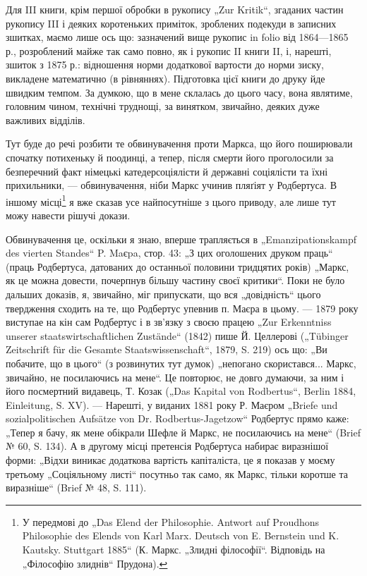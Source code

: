 Для III книги, крім першої обробки в рукопису „Zur Kritik“, згаданих
частин рукопису III і деяких коротеньких приміток, зроблених подекуди
в записних зшитках, маємо лише ось що: зазначений вище рукопис
in folio від 1864—1865 р., розроблений майже так само повно, як
і рукопис II книги II, і, нарешті, зшиток з 1875 р.: відношення норми
додаткової вартости до норми зиску, викладене математично (в рівняннях).
Підготовка цієї книги до друку йде швидким темпом. За думкою,
що в мене склалась до цього часу, вона являтиме, головним чином, технічні
труднощі, за винятком, звичайно, деяких дуже важливих відділів.

Тут буде до речі розбити те обвинувачення проти Маркса, що його
поширювали спочатку потихеньку й поодинці, а тепер, після смерти його
проголосили за безперечний факт німецькі катедерсоціялісти й державні
соціялісти та їхні прихильники, — обвинувачення, ніби Маркс учинив
пляґіят у Родбертуса. В іншому місці\footnote{
У передмові до „Das Elend der Philosophie. Antwort auf Proudhons Philosophie
des Elends von Karl Marx. Deutsch von E. Bernstein und K. Kautsky.
Stuttgart 1885“ (К. Маркс. „Злидні філософії“. Відповідь на „Філософію злиднів“
Прудона).
} я вже сказав усе найпосутніше
з цього приводу, але лише тут можу навести рішучі докази.

Обвинувачення це, оскільки я знаю, вперше трапляється в „Emanzipationskampf
des vierten Standes“ P. Maєpa, стор. 43: „З цих оголошених
друком праць“ (праць Родбертуса, датованих до останньої половини
тридцятих років) „Маркс, як це можна довести, почерпнув більшу частину
своєї критики“. Поки не було дальших доказів, я, звичайно, міг
припускати, що вся „довідність“ цього твердження сходить на те, що
Родбертус упевнив п. Маєра в цьому. — 1879 року виступае на кін сам Родбертус
і в зв’язку з своєю працею „Zur Erkenntniss unserer staatswirtschaftlichen
Zustände“ (1842) пише Й. Целлерові („Tübinger Zeitschrift für
die Gesamte Staatswissenschaft“, 1879, S. 219) ось що: „Ви побачите, що
в цього“ (з розвинутих тут думок) „непогано скористався... Маркс, звичайно,
не посилаючись на мене“. Це повторює, не довго думаючи, за ним
і його посмертний видавець, Т. Козак („Das Kapital von Rodbertus“, Berlin
1884, Einleitung, S. XV). — Нарешті, у виданих 1881 року Р. Маєром
„Briefe und sozialpolitischen Aufsätze von Dr. Rodbertus-Jagetzow“ Родбертус
прямо каже: „Тепер я бачу, як мене обікрали Шефле й Маркс, не
посилаючись на мене“ (Brief № 60, S. 134). А в другому місці претенсія
Родбертуса набирає виразнішої форми: „Відхи виникає додаткова
вартість капіталіста, це я показав у моєму третьому „Соціяльному листі“
посутньо так само, як Маркс, тільки коротше та виразніше“ (Brief
№ 48, S. 111).

